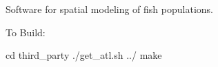 Software for spatial modeling of fish populations.

To Build\-:

cd third\-\_\-party ./get\-\_\-atl.sh ../ make 